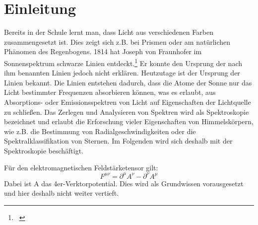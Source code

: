 \section{Einleitung}
Bereits in der Schule lernt man, dass Licht aus verschiedenen Farben zusammengesetzt ist. Dies zeigt sich z.B. bei Prismen oder am natürlichen Phänomen des Regenbogens. 1814 hat Joseph von Fraunhofer im Sonnenspektrum schwarze Linien entdeckt.\footnote{\ \cite{ktroskopie}} Er konnte den Ursprung der nach ihm benannten Linien jedoch nicht erklären. Heutzutage ist der Ursprung der Linien bekannt. Die Linien entstehen dadurch, dass die Atome der Sonne nur das Licht bestimmter Frequenzen absorbieren können, was es erlaubt, aus Absorptions- oder Emissionsspektren von Licht auf Eigenschaften der Lichtquelle zu schließen. Das Zerlegen und Analysieren von Spektren wird als Spektroskopie bezeichnet und erlaubt die Erforschung vieler Eigenschaften von Himmelskörpern, wie z.B. die Bestimmung von Radialgeschwindigkeiten oder die Spektralklassifikation von Sternen. Im Folgenden wird sich deshalb mit der Spektroskopie beschäftigt.


Für den elektromagnetischen Feldstärketensor gilt:
\begin{equation}
F^{\mu \nu} = \partial^{\mu} A^{\nu} - \partial^{\nu} A^{\mu}
\end{equation}
Dabei ist A das 4er-Verktorpotential.
Dies wird als Grundwissen vorausgesetzt und hier deshalb nicht weiter vertieft.